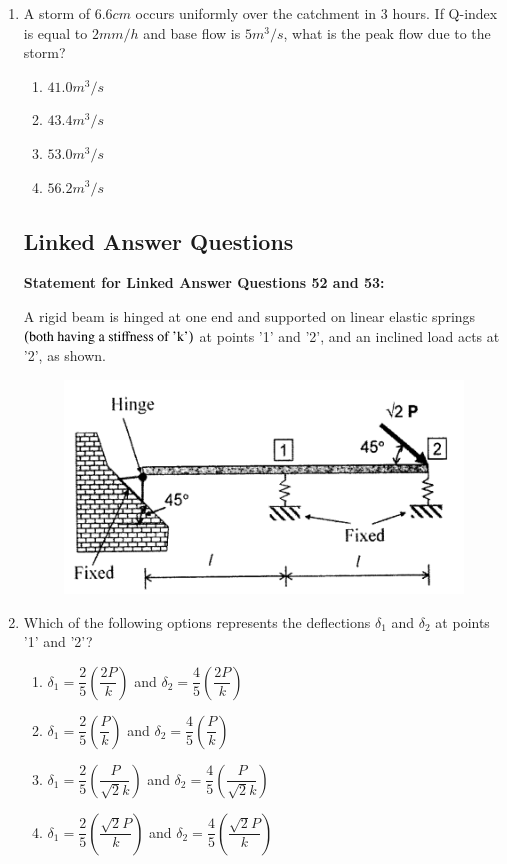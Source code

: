 \documentclass[journal,12pt,onecolumn]{IEEEtran}
\theoremstyle{remark}
\begin{document}
\begin{enumerate}
\item A storm of $6.6 cm$ occurs uniformly over the catchment in 3 hours. If Q-index is equal to $2 mm/h$ and base flow is $5 m^3/s$, what is the peak flow due to the storm?

\hfill{}
\begin{enumerate}
\item $41.0 m^3/s$
\item $43.4 m^3/s$
\item $53.0 m^3/s$
\item $56.2 m^3/s$
\end{enumerate}

\subsection*{Linked Answer Questions}
\textbf{Statement for Linked Answer Questions 52 and 53:}

A rigid beam is hinged at one end and supported on linear elastic springs $\left(\text{both having a stiffness of 'k'}\right)$ at points '1' and '2', and an inclined load acts at '2', as shown.

\begin{figure}[H]
\centering
\includegraphics[width=0.4\columnwidth]{figs/q52,53.png}
\caption*{}
\label{fig:Q.52,53}
\end{figure}
\item Which of the following options represents the deflections $\delta_1$ and $\delta_2$ at points '1' and '2'?

\hfill{}
\begin{enumerate}
\item $\delta_1 = \dfrac{2}{5}\left(\dfrac{2P}{k}\right)$ and $\delta_2 = \dfrac{4}{5}\left(\dfrac{2P}{k}\right)$
\item $\delta_1 = \dfrac{2}{5}\left(\dfrac{P}{k}\right)$ and $\delta_2 = \dfrac{4}{5}\left(\dfrac{P}{k}\right)$
\item $\delta_1 = \dfrac{2}{5}\left(\dfrac{P}{\sqrt{2}k}\right)$ and $\delta_2 = \dfrac{4}{5}\left(\dfrac{P}{\sqrt{2}k}\right)$
\item $\delta_1 = \dfrac{2}{5}\left(\dfrac{\sqrt{2}P}{k}\right)$ and $\delta_2 = \dfrac{4}{5}\left(\dfrac{\sqrt{2}P}{k}\right)$
\end{enumerate}


\end{enumerate}
\end{document}
